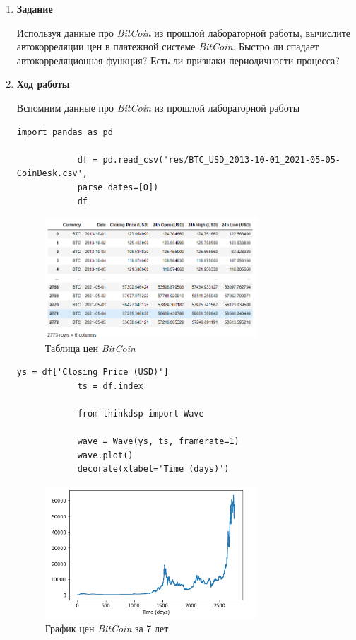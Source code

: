 \documentclass[a4paper,12pt]{article}
\begin{document}
	\begin{enumerate}
		
		
		\item \textbf{Задание}
		
		Используя данные про \textit{BitCoin} из прошлой лабораторной работы, вычислите автокорреляции цен в платежной системе \textit{BitCoin}. Быстро ли спадает автокорреляционная функция? Есть ли признаки периодичности процесса?
		
		\item \textbf{Ход работы}
		
		Вспомним данные про \textit{BitCoin} из прошлой лабораторной работы
		\begin{lstlisting}[caption=Таблица цен \textit{BitCoin}]
			import pandas as pd
			
			df = pd.read_csv('res/BTC_USD_2013-10-01_2021-05-05-CoinDesk.csv', 
			parse_dates=[0])
			df
		\end{lstlisting}
		\begin{figure}[H]
			\centering
			\includegraphics[width=0.75\textwidth]{3_1.png}
			\caption{Таблица цен \textit{BitCoin}}
			\label{fig:3.1}
		\end{figure}
		
		\begin{lstlisting}[caption=График цен \textit{BitCoin}]
			ys = df['Closing Price (USD)']
			ts = df.index
			
			from thinkdsp import Wave
			
			wave = Wave(ys, ts, framerate=1)
			wave.plot()
			decorate(xlabel='Time (days)')
		\end{lstlisting}
		\begin{figure}[H]
			\centering
			\includegraphics[width=0.75\textwidth]{3_2.png}
			\caption{График цен \textit{BitCoin} за 7 лет}
			\label{fig:3.2}
		\end{figure}
	

\end{enumerate}
\end{document}
